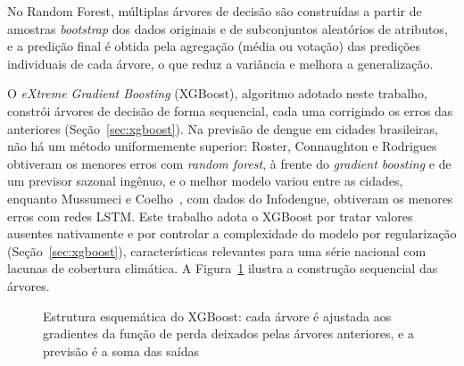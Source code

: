 No Random Forest, múltiplas árvores de decisão são construídas a partir de amostras \textit{bootstrap} dos dados originais e de subconjuntos aleatórios de atributos, e a predição final é obtida pela agregação (média ou votação) das predições individuais de cada árvore, o que reduz a variância e melhora a generalização.

O \textit{eXtreme Gradient Boosting} (XGBoost), algoritmo adotado neste trabalho, constrói árvores de decisão de forma sequencial, cada uma corrigindo os erros das anteriores (Seção~\ref{sec:xgboost}). Na previsão de dengue em cidades brasileiras, não há um método uniformemente superior: Roster, Connaughton e Rodrigues~\cite{roster2022machine} obtiveram os menores erros com \textit{random forest}, à frente do \textit{gradient boosting} e de um previsor sazonal ingênuo, e o melhor modelo variou entre as cidades, enquanto Mussumeci e Coelho~\cite{mussumeci2020large}, com dados do Infodengue, obtiveram os menores erros com redes LSTM. Este trabalho adota o XGBoost por tratar valores ausentes nativamente e por controlar a complexidade do modelo por regularização (Seção~\ref{sec:xgboost}), características relevantes para uma série nacional com lacunas de cobertura climática. A Figura~\ref{fig:schematic_xgboost} ilustra a construção sequencial das árvores.

\begin{figure}[htb]
    \centering
    \caption{Estrutura esquemática do XGBoost: cada árvore é ajustada aos gradientes da função de perda deixados pelas árvores anteriores, e a previsão é a soma das saídas}
    \label{fig:schematic_xgboost}
\end{figure}


